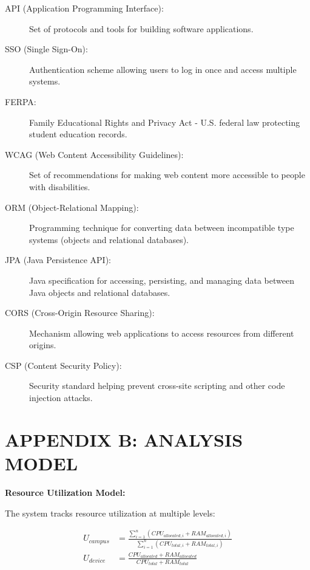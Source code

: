 \documentclass[12pt,a4paper]{article}
\begin{document}
\begin{description}
    \item[API (Application Programming Interface):] Set of protocols and tools for building software applications.
    
    \item[SSO (Single Sign-On):] Authentication scheme allowing users to log in once and access multiple systems.
    
    \item[FERPA:] Family Educational Rights and Privacy Act - U.S. federal law protecting student education records.
    \item[WCAG (Web Content Accessibility Guidelines):] Set of recommendations for making web content more accessible to people with disabilities.
    
    \item[ORM (Object-Relational Mapping):] Programming technique for converting data between incompatible type systems (objects and relational databases).
    
    \item[JPA (Java Persistence API):] Java specification for accessing, persisting, and managing data between Java objects and relational databases.
    
    \item[CORS (Cross-Origin Resource Sharing):] Mechanism allowing web applications to access resources from different origins.
    
    \item[CSP (Content Security Policy):] Security standard helping prevent cross-site scripting and other code injection attacks.
\end{description}

\newpage

\section*{APPENDIX B: ANALYSIS MODEL}
\label{app:analysis}

\textbf{Resource Utilization Model:}

The system tracks resource utilization at multiple levels:

\begin{align*}
U_{campus} &= \frac{\sum_{i=1}^{n} (CPU_{allocated,i} + RAM_{allocated,i})}{\sum_{i=1}^{n} (CPU_{total,i} + RAM_{total,i})} \\
U_{device} &= \frac{CPU_{allocated} + RAM_{allocated}}{CPU_{total} + RAM_{total}}
\end{align*}
\end{document}
